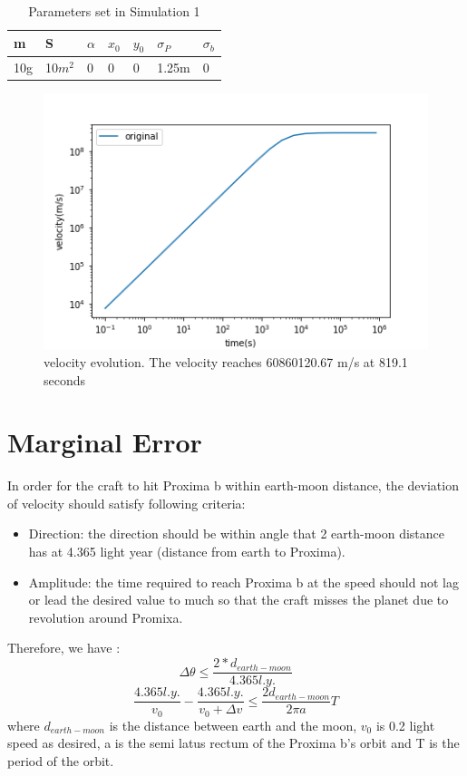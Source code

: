 \documentclass{article}
\begin{document}
\begin{table}[!htb]
	\centering
	\label{par1}
	\caption{Parameters set in Simulation 1}
	\begin{tabular}{lllllll}
		\toprule
		m	&S	&$\alpha$	&$x_0$	&$y_0$	&$\sigma_P$	&$\sigma_b$\\
		\midrule
		10g	&10$m^2$	&0	&0	&0	&1.25m	&0
		
	\end{tabular}
\end{table}

\begin{figure}[]
	\centering
	\includegraphics[width=12cm]{simu.png}
	
	\caption{velocity evolution. The velocity reaches 60860120.67 m/s at 819.1 seconds}
	\label{sim1}
\end{figure}


\section{Marginal Error}
	In order for the craft to hit Proxima b within earth-moon distance, the deviation of velocity should satisfy following criteria:
	\begin{itemize}
		\item Direction: the direction should be within angle that 2 earth-moon distance has at 4.365 light year (distance from earth to Proxima). 
		\item Amplitude: the time required to reach Proxima b at the speed should not lag or lead the desired value to much so that the craft misses the planet due to revolution around Promixa. 
	\end{itemize}
	Therefore, we have :
	\begin{equation}
		\Delta \theta \le \frac{2*d_{earth-moon}}{4.365 l.y.}
	\end{equation}
	\begin{equation}
		\frac{4.365l.y.}{v_0}- \frac{4.365l.y.}{v_0+\Delta v}\le \frac{2d_{earth-moon}}{2\pi a} T
	\end{equation}
	where $d_{earth-moon}$ is the distance between earth and the moon, $v_0$ is 0.2 light speed as desired, a is the semi latus rectum of the Proxima b's orbit and T is the period of the orbit.
	
\end{document}
